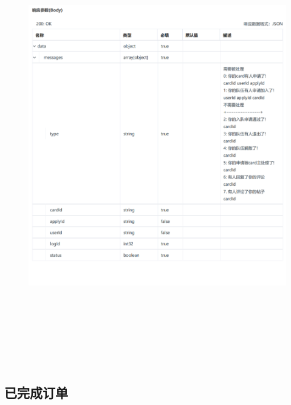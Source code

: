             \begin{figure}[h]
                \centering
                \includegraphics[height=19.0cm,width=14.0cm]{design/image/api30.png} 
                \end{figure}  
                \newpage
        \subsection{已完成订单}        
